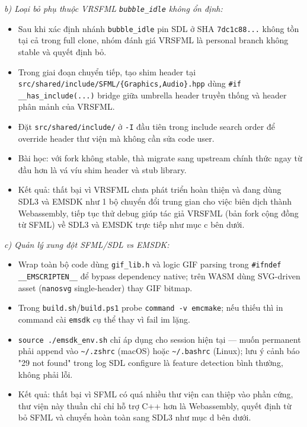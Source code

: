 \documentclass[12pt,a4paper]{article}
\begin{document}
\textit{b) Loại bỏ phụ thuộc VRSFML \texttt{bubble\_idle} không ổn định:}
\begin{itemize}
    \item Sau khi xác định nhánh \texttt{bubble\_idle} pin SDL ở SHA \texttt{7dc1c88...} không tồn tại cả trong full clone, nhóm đánh giá VRSFML là personal branch không stable và quyết định bỏ.
    \item Trong giai đoạn chuyển tiếp, tạo shim header tại \texttt{src/shared/\allowbreak include/\allowbreak SFML/\allowbreak \{Graphics,Audio\}.hpp} dùng \texttt{\#if \_\_has\_include(...)} bridge giữa umbrella header truyền thống và header phân mảnh của VRSFML.
    \item Đặt \texttt{src/shared/include/} ở \texttt{-I} đầu tiên trong include search order để override header thư viện mà không cần sửa code user.
    \item Bài học: với fork không stable, thà migrate sang upstream chính thức ngay từ đầu hơn là vá víu shim header và stub library.
    \item Kết quả: thất bại vì VRSFML chưa phát triển hoàn thiện và đang dùng SDL3 và EMSDK như 1 bộ chuyển đổi trung gian cho việc biên dịch thành Webassembly, tiếp tục thử debug giúp tác giả VRSFML (bản fork cộng đồng từ SFML) về SDL3 và EMSDK trực tiếp như mục c bên dưới.
\end{itemize}

\textit{c) Quản lý xung đột SFML/SDL vs EMSDK:}
\begin{itemize}
    \item Wrap toàn bộ code dùng \texttt{gif\_lib.h} và logic GIF parsing trong \texttt{\#ifndef \_\_EMSCRIPTEN\_\_} để bypass dependency native; trên WASM dùng SVG-driven asset (\texttt{nanosvg} single-header) thay GIF bitmap.
    \item Trong \texttt{build.sh}/\texttt{build.ps1} probe \texttt{command -v emcmake}; nếu thiếu thì in command cài \texttt{emsdk} cụ thể thay vì fail im lặng.
    \item \texttt{source ./emsdk\_env.sh} chỉ áp dụng cho session hiện tại — muốn permanent phải append vào \texttt{\textasciitilde/.zshrc} (macOS) hoặc \texttt{\textasciitilde/.bashrc} (Linux); lưu ý cảnh báo "29 not found" trong log SDL configure là feature detection bình thường, không phải lỗi.
    \item Kết quả: thất bại vì SFML có quá nhiều thư viện can thiệp vào phần cứng, thư viện này thuần chỉ chỉ hỗ trợ C++ hơn là Webassembly, quyết định từ bỏ SFML và chuyển hoàn toàn sang SDL3 như mục d bên dưới.
\end{itemize}
\end{document}
